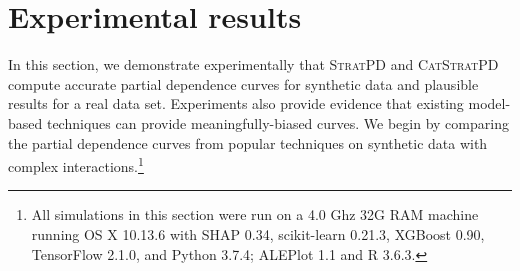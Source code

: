 \documentclass[]{article} %
\newcommand{\cut}[1]{}
\newcommand{\spd}{\fontfamily{cmr}\textsc{\small StratPD}}
\newcommand{\cspd}{\fontfamily{cmr}\textsc{\small CatStratPD}}
\renewcommand{\slash}{\texttt{\char`\\}}
\DeclareMathOperator{\Ex}{\mathbb{E}}
\begin{document}
\cut{
{\bf Comparison}

${\it FPD}_j(z) = \Ex[\hat{f}(x_{j}=z,{\bf X}_{\slash j})])$

SHAP for one $S$ is $\phi_j(\hat{f},{\bf x}) = \Ex[\hat{f}(x_{S \cup \{j\}},{\bf X}_{\slash (S \cup \{j\})})  | {\bf X}_{S \cup \{j\}} = x_{S \cup \{j\}}] - \Ex[\hat{f}(x_{S},{\bf X}_{\slash S})  | {\bf X}_S = x_S ]$ for all subsets $S \subset F$ for $F = \{1, 2, .., p\}$. When $S = F \slash \{j\}$, like ALE, it becomes $\Ex[\hat{f}(x_F)] - \Ex[\hat{f}(x_{F \slash \{j\}},{\bf X}_j)]$ or $\hat{f}({\bf x}) - \text{\it FPD}_{F \slash \{j\}}(x)$ if assume independence.

ALE at $x_j=z$, it is cumsum of $\Ex[\hat{f}(b_k, {\bf X}_{\slash j}) - \hat{f}(b_{k-1}, {\bf X}_{\slash j}) \, | \, x_j \in (b_{k-1},b_k]]$ for bin $b_k$ partitioning min..max for var $j$ into $K$ intervals.

StratPD at $x_j=z$ is $\Ex[ (y^{(i_L+1)} - y^{i_L})/(x_j^{(i_L+1)} - x_j^{(i_L)}) \, | \, z \in [x_j^{(i_L+1)} - x_j^{(i_L)}) \text{ and } L \in T]$

$\Ex[ \phi_j(\hat{f},x) | {\bf X}_j = z] = FPD_j(x) - \bar{y}$ if features independent. SHAP's implementation approximates $\hat{f}$ trained on just $S$ features, $\hat{f}_S(x_S)$, with $\Ex[\hat{f}(x_{S},{\bf X}_{\bar{S}})]$ by assuming independent features.
}

\section{Experimental results}\label{sec:experiments} 

In this section, we demonstrate experimentally that \spd{} and \cspd{} compute accurate partial dependence curves for synthetic data and plausible results for a real data set. Experiments also provide evidence that existing model-based techniques can provide meaningfully-biased curves. We begin by comparing the partial dependence curves from popular techniques on synthetic data with complex interactions.\footnote{All simulations in this section were run on a 4.0 Ghz 32G RAM machine running OS X 10.13.6 with SHAP 0.34, scikit-learn 0.21.3, XGBoost 0.90, TensorFlow 2.1.0, and Python 3.7.4; ALEPlot 1.1 and R 3.6.3.}
\end{document}
